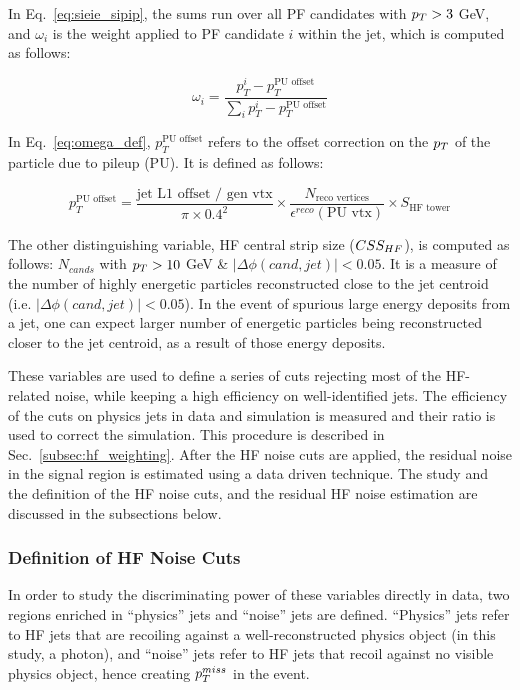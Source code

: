In Eq.~\ref{eq:sieie_sipip}, the sums run over all PF candidates with $p_T > 3$ GeV, and 
$\omega_i$ is the weight applied to PF candidate $i$ within the jet, which is computed as follows:

\begin{equation}
    \omega_i = \frac{p_T^i - p_T^{\text{PU offset}}}{\sum_{i} p_T^{i} - p_T^{\text{PU offset}} }
    \label{eq:omega_def}
\end{equation}

In Eq.~\ref{eq:omega_def}, $p_T^{\text{PU offset}}$ refers to the offset correction on the $p_T$ of the particle 
due to pileup (PU). It is defined as follows:

\begin{equation}
    p_T^{\text{PU offset}} = \frac{\text{jet L1 offset / gen vtx}}{\pi \times 0.4^2} \times \frac{N_{\text{reco vertices}}}{\epsilon^{reco}(\text{PU vtx})} \times S_{\text{HF tower}}
\end{equation}

The other distinguishing variable, HF central strip size ($CSS_{HF}$), is computed as follows: 
$N_{cands}$ with $p_T > 10$ GeV \& $|\Delta\phi(cand,jet)| < 0.05$. It is a measure of the number of
highly energetic particles reconstructed close to the jet centroid (i.e. $|\Delta\phi(cand,jet)| < 0.05$).
In the event of spurious large energy deposits from a jet, one can expect larger number of energetic particles
being reconstructed closer to the jet centroid, as a result of those energy deposits.

These variables are used to define a series of cuts rejecting most of the HF-related noise, while keeping a high efficiency on well-identified jets. 
The efficiency of the cuts on physics jets in data and simulation is measured and their ratio is used to correct the simulation.
This procedure is described in Sec.~\ref{subsec:hf_weighting}. After the HF noise cuts are applied, the residual noise in the signal region is estimated using a data driven technique.
The study and the definition of the HF noise cuts, and the residual HF noise estimation are discussed in the subsections below. 

\subsubsection{Definition of HF Noise Cuts}

In order to study the discriminating power of these variables directly in data, two regions enriched in ``physics'' jets and ``noise'' jets are defined. ``Physics'' jets
refer to HF jets that are recoiling against a well-reconstructed physics object (in this study, a photon), and ``noise'' jets 
refer to HF jets that recoil against no visible physics object, hence creating $p_T^{miss}$ in the event. 

